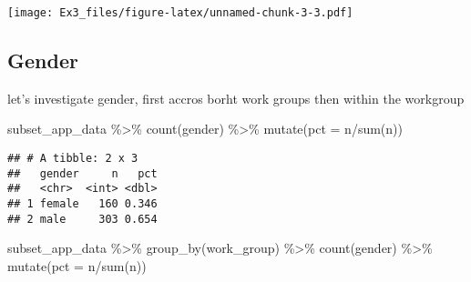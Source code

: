 \documentclass[
]{article}
\newenvironment{Shaded}{\begin{snugshade}}{\end{snugshade}}
\newcommand{\AttributeTok}[1]{\textcolor[rgb]{0.77,0.63,0.00}{#1}}
\newcommand{\CommentTok}[1]{\textcolor[rgb]{0.56,0.35,0.01}{\textit{#1}}}
\newcommand{\DecValTok}[1]{\textcolor[rgb]{0.00,0.00,0.81}{#1}}
\newcommand{\FunctionTok}[1]{\textcolor[rgb]{0.00,0.00,0.00}{#1}}
\newcommand{\NormalTok}[1]{#1}
\newcommand{\OtherTok}[1]{\textcolor[rgb]{0.56,0.35,0.01}{#1}}
\newcommand{\SpecialCharTok}[1]{\textcolor[rgb]{0.00,0.00,0.00}{#1}}
\begin{document}
\texttt{[image: Ex3\_files/figure-latex/unnamed-chunk-3-3.pdf]}

\begin{Shaded}
\end{Shaded}

\hypertarget{gender}{%
\subsection{Gender}\label{gender}}

let's investigate gender, first accros borht work groups then within the
workgroup

\begin{Shaded}
\begin{Highlighting}[]
\NormalTok{subset\_app\_data }\SpecialCharTok{\%\textgreater{}\%} 
  \FunctionTok{count}\NormalTok{(gender) }\SpecialCharTok{\%\textgreater{}\%} 
  \FunctionTok{mutate}\NormalTok{(}\AttributeTok{pct =}\NormalTok{ n}\SpecialCharTok{/}\FunctionTok{sum}\NormalTok{(n))}
\end{Highlighting}
\end{Shaded}

\begin{verbatim}
## # A tibble: 2 x 3
##   gender     n   pct
##   <chr>  <int> <dbl>
## 1 female   160 0.346
## 2 male     303 0.654
\end{verbatim}

\begin{Shaded}
\begin{Highlighting}[]
\NormalTok{subset\_app\_data }\SpecialCharTok{\%\textgreater{}\%} 
  \FunctionTok{group\_by}\NormalTok{(work\_group) }\SpecialCharTok{\%\textgreater{}\%}
  \FunctionTok{count}\NormalTok{(gender) }\SpecialCharTok{\%\textgreater{}\%} 
  \FunctionTok{mutate}\NormalTok{(}\AttributeTok{pct =}\NormalTok{ n}\SpecialCharTok{/}\FunctionTok{sum}\NormalTok{(n))}
\end{Highlighting}
\end{Shaded}
\end{document}
